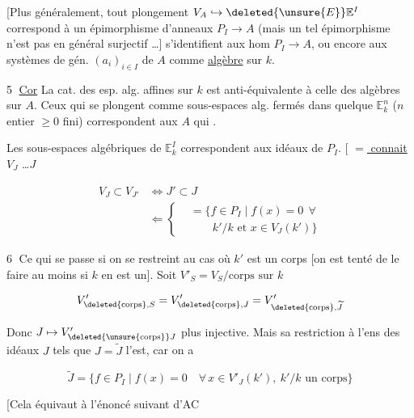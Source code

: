 [Plus généralement, tout plongement $V_A\hookrightarrow\deleted{\unsure{E}}\mathbb E^I$ correspond à un épimorphisme d'anneaux $P_I\to A$ (mais un tel épimorphisme n'est pas en général surjectif \ldots] s'identifient aux hom  $P_I\to A$, ou encore aux systèmes de gén. $(a_i)_{i\in I}$ de $A$ comme \uline{algèbre} sur $k$.


\textcircled{5} \uline{Cor} La cat. des esp. alg. affines sur $k$ est anti-équivalente à celle des algèbres sur $A$. Ceux qui se plongent comme sous-espaces alg. fermés dans quelque $\mathbb E_k^n$ ($n$ entier $\geq0$ fini)  correspondent aux $A$ qui  .

Les  sous-espaces algébriques de $\mathbb E_k^I$ correspondent aux idéaux de $P_I$.  $\bigl[$ \uline{ $=$ connait} $V_J$ \ldots {}$J$

\[
\begin{aligned}
V_J\subset V_{J'}&\Longleftrightarrow J'\subset J\\[-2pt]
&\Leftarrow\left\{\begin{aligned}&=\{f\in P_I\mid f(x)=0\ \ \forall\\&\qquad k'/k\text{ et }x\in V_J(k')\}\end{aligned}\right.
\end{aligned}
\]


\textcircled{6} Ce qui se passe si on se restreint au cas où $k'$ est un corps [on est tenté de le faire au moins si $k$ en est un].  Soit $V'_S=V_S/\text{corps sur }k$

\[
V^{\prime}_{\deleted{\mathrm{corps}},S}=V^{\prime}_{\deleted{\mathrm{corps}},J}=V^{\prime}_{\deleted{\mathrm{corps}},\widetilde J}
\]

Donc $J\mapsto V^{\prime}_{\deleted{\unsure{\mathrm{corps}}}J}$ plus injective. Mais sa restriction à l'ens des idéaux  $J$ tels que $J=\widetilde J$ l'est, car on a

\[
\widetilde J=\{f\in P_I\mid f(x)=0\quad\forall\,x\in V'_J(k'),\ k'/k\text{ un corps}\}
\]

[Cela  équivaut à l'énoncé suivant d'AC

